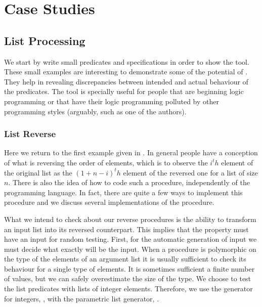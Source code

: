 
\section{Case Studies}
\label{sec:case-studies}

\subsection{List Processing}
We start by write  small predicates and specifications in order to show
the tool.
%
These small examples are interesting to demonstrate some of the
potential of \plqc{}.
%
They help in revealing discrepancies between intended and actual
behaviour of the predicates.
%
The tool is specially useful for people that are beginning logic
programming or that have their logic programming polluted by other
programming styles (arguably,  such as one of the authors).



\subsubsection{List Reverse}

Here we return to the first example given in .
%
In general people have a conception of what is reversing the order of
elements, which is to observe the $i^th$ element of the original list as
the $(1+n-i)^th$ element of the reversed one for a list of size $n$.
%
There is also the idea of how to code such a procedure, independently of
the programming language.
%
In fact, there are quite a few ways to implement this procedure and we
discuss several implementations of the procedure.


What we intend to check about our reverse procedures is the ability to
transform an input list into its reversed counterpart.
%
This implies that the property must have an input for random testing.
%
First, for the automatic generation of input we must decide what
exactly  will be the input.
%
When a procedure is polymorphic on the type of the elements of an
argument list it is usually sufficient to check its behaviour for a
single type of elements.
%
It is sometimes sufficient a finite number of values, but we can
safely overestimate the size of the type.
%
We choose to test the list predicates with lists of integer elements.
%
Therefore, we use the generator for integers, , with the
parametric list generator, .


